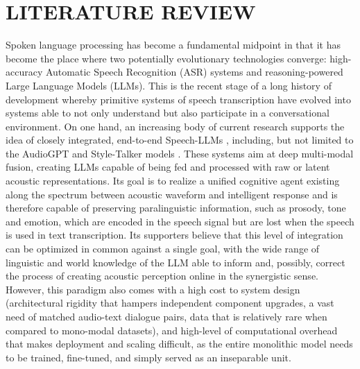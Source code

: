 \newpage


\section{\MakeUppercase{Literature Review}}
Spoken language processing has become a fundamental midpoint in that it has become the place where two potentially evolutionary technologies converge: high-accuracy Automatic Speech Recognition (ASR) systems and reasoning-powered Large Language Models (LLMs). This is the recent stage of a long history of development whereby primitive systems of speech transcription have evolved into systems able to not only understand but also participate in a conversational environment. On one hand, an increasing body of current research supports the idea of closely integrated, end-to-end Speech-LLMs \cite{speechLLM}, including, but not limited to the AudioGPT \cite{audiogpt2023} and Style-Talker models \cite{styletalker}. These systems aim at deep multi-modal fusion, creating LLMs capable of being fed and processed with raw or latent acoustic representations. Its goal is to realize a unified cognitive agent existing along the spectrum between acoustic waveform and intelligent response and is therefore capable of preserving paralinguistic information, such as prosody, tone and emotion, which are encoded in the speech signal but are lost when the speech is used in text transcription. Its supporters believe that this level of integration can be optimized in common against a single goal, with the wide range of linguistic and world knowledge of the LLM able to inform and, possibly, correct the process of creating acoustic perception online in the synergistic sense. However, this paradigm also comes with a high cost to system design (architectural rigidity that hampers independent component upgrades, a vast need of matched audio-text dialogue pairs, data that is relatively rare when compared to mono-modal datasets), and high-level of computational overhead that makes deployment and scaling difficult, as the entire monolithic model needs to be trained, fine-tuned, and simply served as an inseparable unit.

